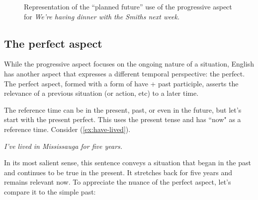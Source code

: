 \begin{figure}[ht]
    \centering
    \caption{Representation of the ``planned future'' use of the progressive aspect for \textit{We're having dinner with the Smiths next week.}}
    \label{fig:futurate-progressive}
\end{figure}

\subsection{The perfect aspect}\label{sec:perfect-aspect}
While the progressive aspect focuses on the ongoing nature of a situation, English has another aspect that expresses a different temporal perspective: the perfect. The perfect aspect, formed with a form of have + past participle, asserts the relevance of a previous situation (or action, etc) to a later time.

The reference time can be in the present, past, or even in the future, but let's start with the present perfect. This uses the present tense and has ``now" as a reference time. Consider (\ref{ex:have-lived}).

\ea \textit{I've lived in Mississauga for five years.}\label{ex:have-lived}
\z

In its most salient sense, this sentence conveys a situation that began in the past and continues to be true in the present. It stretches back for five years and remains relevant now. To appreciate the nuance of the perfect aspect, let's compare it to the simple past:

